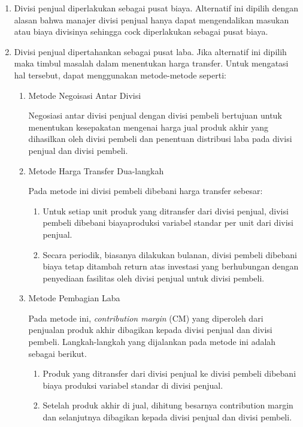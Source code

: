 \begin{enumerate}
	\item Divisi penjual diperlakukan sebagai pusat biaya. Alternatif ini dipilih dengan alasan bahwa manajer divisi penjual hanya dapat mengendalikan masukan atau biaya divisinya sehingga cock diperlakukan sebagai pusat biaya.
	\item Divisi penjual dipertahankan sebagai pusat laba. Jika alternatif ini dipilih maka timbul masalah dalam menentukan harga transfer. Untuk mengatasi hal tersebut, dapat menggunakan metode-metode seperti:

	\begin{enumerate}
		\item Metode Negoisasi Antar Divisi
		
		Negosiasi antar divisi penjual dengan divisi pembeli bertujuan untuk menentukan kesepakatan mengenai harga jual produk akhir yang dihasilkan oleh divisi pembeli dan penentuan distribusi laba pada divisi penjual dan divisi pembeli. 

		\item Metode Harga Transfer Dua-langkah
		
		Pada metode ini divisi pembeli dibebani harga transfer sebesar:

		\begin{enumerate}
			\item Untuk setiap unit produk yang ditransfer dari divisi penjual, divisi pembeli dibebani biayaproduksi variabel standar per unit dari divisi penjual.
			\item Secara periodik, biasanya dilakukan bulanan, divisi pembeli dibebani biaya tetap ditambah return atas investasi yang berhubungan dengan penyediaan fasilitas oleh divisi penjual untuk divisi pembeli.
		\end{enumerate}

		\item Metode Pembagian Laba
		
		Pada metode ini, \textit{contribution margin} (CM) yang diperoleh dari penjualan produk akhir dibagikan kepada divisi penjual dan divisi pembeli. Langkah-langkah yang dijalankan pada metode ini adalah sebagai berikut.

		\begin{enumerate}
			\item Produk yang ditransfer dari divisi penjual ke divisi pembeli dibebani biaya produksi variabel standar di divisi penjual.
			\item Setelah produk akhir di jual, dihitung besarnya contribution margin dan selanjutnya dibagikan kepada divisi penjual dan divisi pembeli.
		\end{enumerate}


\end{enumerate}
\end{enumerate}
